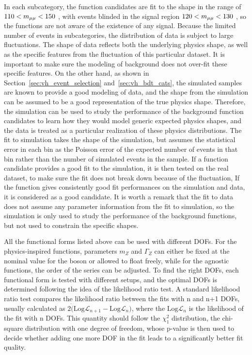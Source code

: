 In each subcategory, the function candidates are fit to the \mmm shape in the range of $110 < m_{\mu\mu} < 150$ \GeV, 
with events blinded in the signal region $120 < m_{\mu\mu} < 130$ \GeV, so the functions are not aware of the existence of any signal.
Because the limited number of events in \VH subcategories, the distribution of data is subject to large fluctuations.
The \mmm shape of data reflects both the underlying physics shape, as well as the specific features from the fluctuation of this particular dataset.
It is important to make sure the modeling of background does not over-fit these specific features.
On the other hand, as shown in Section~\ref{sec:vh_event_selection} and~\ref{sec:vh_bdt_cats}, 
the simulated samples are known to provide a good modeling of data,   
and the \mmm shape from the simulation can be assumed to be a good representation of the true physics shape.
Therefore, the simulation can be used to study the performance of the background function candidates 
to learn how they would model generic expected physics shapes,
and the data is treated as a particular realization of these physics distributions.
The fit to simulation takes the \mmm shape of the simulation,
but assumes the statistical error in each bin as the Poisson error of the expected number of events in that bin rather than the number of simulated events in the sample.
If a function candidate provides a good fit to the simulation, it is then tested on the real dataset, 
to make sure the fit does not break down because of the fluctuation, 
If the function gives consistently good fit performances on the simulation and data, it is considered as a good candidate.
It is worth a remark that the fit to data does not assume any parameter information from the fit to simulation,
so the simulation is only used to study the performance of the background functions, but not used to constrain the specific shapes.

All the functional forms listed above can be used with different DOFs.
For the physics-inspired functions, parameters $m_{Z}$ and $\Gamma_{Z}$ can either be fixed at the nominal value for the \PZ boson or allowed to float freely,
while for the agnostic functions, the order of the series can be adjusted.
To find the right DOFs, each functional form is tested with different setups,
and the optimal DOFs is determined following the idea of the likelihood ratio test.
A standard likelihood ratio test compares the likelihood ratio between the fits with n and n+1 DOFs, 
usually calculated as $2\dot(\mathrm{Log}\mathcal{L}_{n+1}-\mathrm{Log}\mathcal{L}_{n})$, 
where the $\mathrm{Log}\mathcal{L}_{n}$ is the likelihood of the fit with n DOFs.
This quantity should follow the $\chi^{2}_{1}$ distribution, the chi-square distribution with one degree of freedom, 
whose p-value is then used to decide whether adding one more DOF in the fit leads to a significantly better fit quality.

